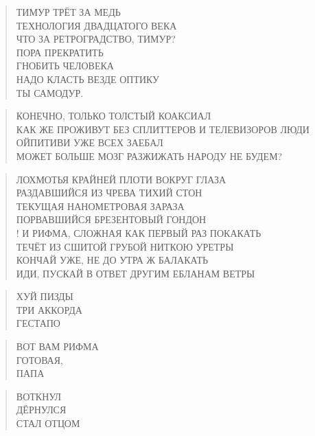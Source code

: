 \poemtitle{***}
\begin{verse}
ТИМУР ТРЁТ ЗА МЕДЬ\\
ТЕХНОЛОГИЯ ДВАДЦАТОГО ВЕКА\\
ЧТО ЗА РЕТРОГРАДСТВО, ТИМУР?\\
ПОРА ПРЕКРАТИТЬ\\
        ГНОБИТЬ ЧЕЛОВЕКА\\
                НАДО КЛАСТЬ ВЕЗДЕ ОПТИКУ\\
                          ТЫ САМОДУР.
\end{verse}

\poemtitle{***}
\begin{verse}
КОНЕЧНО, ТОЛЬКО ТОЛСТЫЙ КОАКСИАЛ\\
КАК ЖЕ ПРОЖИВУТ БЕЗ СПЛИТТЕРОВ И ТЕЛЕВИЗОРОВ ЛЮДИ\\
ОЙПИТИВИ УЖЕ ВСЕХ ЗАЕБАЛ\\
МОЖЕТ БОЛЬШЕ МОЗГ РАЗЖИЖАТЬ НАРОДУ НЕ БУДЕМ?
\end{verse}

\poemtitle{***}
\begin{verse}
ЛОХМОТЬЯ КРАЙНЕЙ ПЛОТИ ВОКРУГ ГЛАЗА\\
РАЗДАВШИЙСЯ ИЗ ЧРЕВА ТИХИЙ СТОН\\
ТЕКУЩАЯ НАНОМЕТРОВАЯ ЗАРАЗА\\
ПОРВАВШИЙСЯ БРЕЗЕНТОВЫЙ ГОНДОН\\!
И РИФМА, СЛОЖНАЯ КАК ПЕРВЫЙ РАЗ ПОКАКАТЬ\\
ТЕЧЁТ ИЗ СШИТОЙ ГРУБОЙ НИТКОЮ УРЕТРЫ\\
КОНЧАЙ УЖЕ, НЕ ДО УТРА Ж БАЛАКАТЬ\\
ИДИ, ПУСКАЙ В ОТВЕТ ДРУГИМ ЕБЛАНАМ ВЕТРЫ
\end{verse}

\poemtitle{***}
\begin{verse}
ХУЙ ПИЗДЫ\\
ТРИ АККОРДА\\
ГЕСТАПО
\end{verse}

\poemtitle{***}
\begin{verse}
ВОТ ВАМ РИФМА\\
ГОТОВАЯ,\\
ПАПА
\end{verse}

\poemtitle{***}
\begin{verse}
ВОТКНУЛ\\
ДЁРНУЛСЯ\\
СТАЛ ОТЦОМ
\end{verse}

